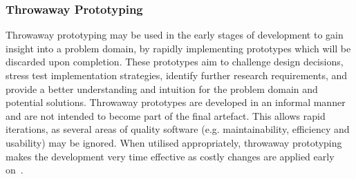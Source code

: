 
\subsubsection{Throwaway Prototyping}
\label{sec:method_throwaway_prototyping}

Throwaway prototyping may be used in the early stages of development to gain insight into a problem domain, by rapidly implementing prototypes which will be discarded upon completion. These prototypes aim to challenge design decisions, stress test implementation strategies, identify further research requirements, and provide a better understanding and intuition for the problem domain and potential solutions. Throwaway prototypes are developed in an informal manner and are not intended to become part of the final artefact. This allows rapid iterations, as several areas of quality software (e.g. maintainability, efficiency and usability) may be ignored. When utilised appropriately, throwaway prototyping makes the development very time effective as costly changes are applied early on~\cite{operational_prototyping}.
